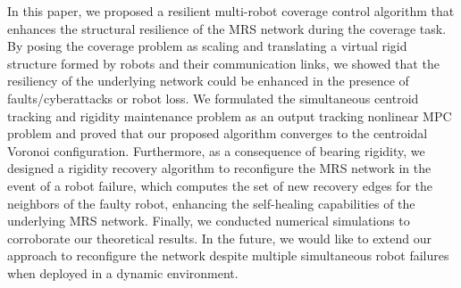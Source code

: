 In this paper, we proposed a resilient multi-robot coverage control algorithm that enhances the structural resilience of the MRS network during the coverage task. By posing the coverage problem as scaling and translating a virtual rigid structure formed by robots and their communication links, we showed that the resiliency of the underlying network could be enhanced in the presence of faults/cyberattacks or robot loss. We formulated the simultaneous centroid tracking and rigidity maintenance problem as an output tracking nonlinear MPC problem and proved that our proposed algorithm converges to the centroidal Voronoi configuration. Furthermore, as a consequence of bearing rigidity, we designed a rigidity recovery algorithm to reconfigure the MRS network in the event of a robot failure, which computes the set of new recovery edges for the neighbors of the faulty robot, enhancing the self-healing capabilities of the underlying MRS network. Finally, we conducted numerical simulations to corroborate our theoretical results. In the future, we would like to extend our approach to reconfigure the network despite multiple simultaneous robot failures when deployed in a dynamic environment.  


